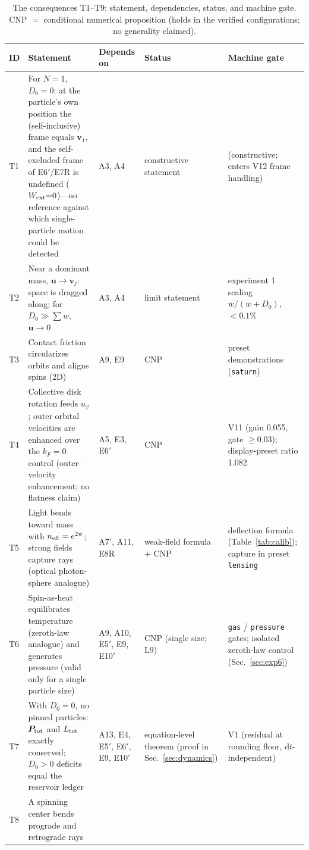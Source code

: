 \documentclass[aps,reprint,amsmath,amssymb,nofootinbib,superscriptaddress,floatfix]{revtex4-2}
\newcommand{\ud}{\mathrm{d}}
\newcommand{\vect}[1]{\bm{#1}}
\newcommand{\Dz}{D_0}
\begin{document}
\begin{table}[t]
\caption{\label{tab:theorems}%
The consequences T1--T9: statement, dependencies, status, and machine
gate.
CNP $=$ conditional numerical proposition (holds in the verified
configurations; no generality claimed).}
\begin{ruledtabular}
\begin{tabular}{lp{}p{}p{}p{}}
ID & Statement & Depends on & Status & Machine gate \\
\hline
T1 & For $N{=}1$, $\Dz{=}0$: at the particle's own position the
(self-inclusive) frame equals $\vect{v}_1$, and the self-excluded
frame of E6$'$/E7R is undefined ($W_{\rm ext}{=}0$)---no reference
against which single-particle motion could be detected & A3, A4 &
constructive statement & (constructive; enters V12
frame handling) \\
T2 & Near a dominant mass, $\vect{u} \to \vect{v}_j$: space is
dragged along; for $\Dz \gg \sum w$, $\vect{u} \to 0$ & A3, A4 &
limit statement & experiment 1 scaling
$\bar w/(\bar w{+}\Dz)$, $<0.1\%$ \\
T3 & Contact friction circularizes orbits and aligns spins (2D) &
A9, E9 & CNP & preset demonstrations (\texttt{saturn}) \\
T4 & Collective disk rotation feeds $u_\varphi$; outer orbital
velocities are enhanced over the $k_F{=}0$ control
(outer-velocity enhancement; no flatness claim) & A5, E3, E6$'$ &
CNP & V11 (gain 0.055, gate $\ge$0.03); display-preset ratio 1.082 \\
T5 & Light bends toward mass with $n_{\rm eff} = e^{2\psi}$;
strong fields capture rays (optical photon-sphere analogue) &
A7$'$, A11, E8R & weak-field formula $+$ CNP & deflection formula
(Table~\ref{tab:calib}); capture in preset \texttt{lensing} \\
T6 & Spin-as-heat equilibrates temperature (zeroth-law analogue)
and generates pressure (valid only for a single particle size) & A9,
A10,
E5$'$, E9, E10$'$ & CNP (single size; L9) & \texttt{gas} /
\texttt{pressure} gates; isolated zeroth-law control
(Sec.~\ref{sec:exp6}) \\
T7 & With $\Dz{=}0$, no pinned particles: $\vect{P}_{\rm tot}$ and
$L_{\rm tot}$ exactly conserved; $\Dz{>}0$ deficits equal the
reservoir ledger & A13, E4, E5$'$, E6$'$, E9, E10$'$ &
equation-level theorem (proof in Sec.~\ref{sec:dynamics}) & V1
(residual at rounding floor, $\ud t$-independent) \\
T8 & A spinning center bends prograde and retrograde rays

\end{tabular}
\end{ruledtabular}
\end{table}
\end{document}

